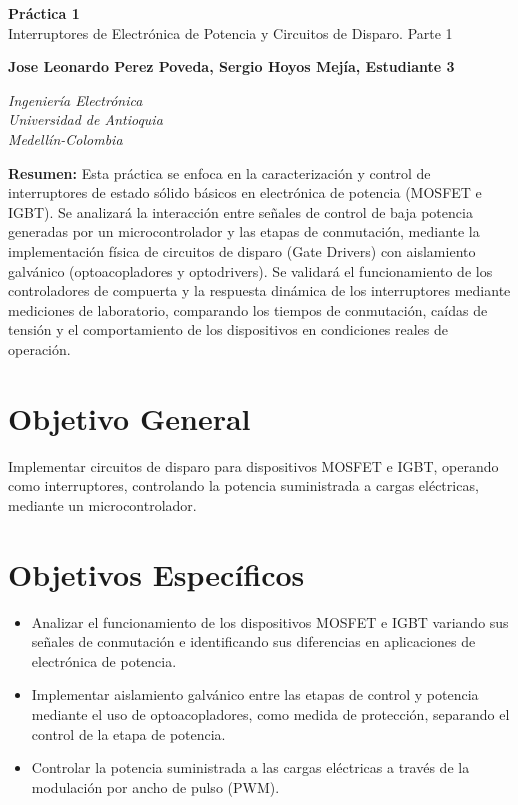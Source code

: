 \documentclass[12pt]{article}
\newcommand{\estudiantes}{Jose Leonardo Perez Poveda, Sergio Hoyos Mejía, Estudiante 3}
\begin{document}
\begin{center}
    {\Huge \textcolor{tituloazul}{\textbf{Práctica 1}\\ Interruptores de Electrónica de Potencia y Circuitos de Disparo. Parte 1}}
    \vspace{0.6cm}

    {\textbf{\estudiantes}}
    \vspace{0.5cm}

    \textit{Ingeniería Electrónica}\\
    \textit{Universidad de Antioquia}\\
    \textit{Medellín-Colombia}
\end{center}

\vspace{0.5cm}

\noindent\textcolor{tituloazul}{\textbf{Resumen:}} Esta práctica se enfoca en la caracterización y control de interruptores de estado sólido básicos en electrónica de potencia (MOSFET e IGBT). Se analizará la interacción entre señales de control de baja potencia generadas por un microcontrolador y las etapas de conmutación, mediante la implementación física de circuitos de disparo (Gate Drivers) con aislamiento galvánico (optoacopladores y optodrivers). Se validará el funcionamiento de los controladores de compuerta  y la respuesta dinámica de los interruptores mediante mediciones de laboratorio, comparando los tiempos de conmutación, caídas de tensión y el comportamiento de los dispositivos en condiciones reales de operación.


\section{Objetivo General}
Implementar circuitos de disparo para dispositivos MOSFET e IGBT, operando como interruptores, controlando la potencia suministrada a cargas eléctricas, mediante un microcontrolador.

\section{Objetivos Específicos}
    \begin{itemize}
        \item Analizar el funcionamiento de los dispositivos MOSFET e IGBT variando sus señales de conmutación e identificando sus diferencias en aplicaciones de electrónica de potencia.
        \item Implementar aislamiento galvánico entre las etapas de control y potencia mediante el uso de optoacopladores, como medida de protección, separando el control de la etapa de potencia.
        \item Controlar la potencia suministrada a las cargas eléctricas a través de la modulación por ancho de pulso (PWM).
    \end{itemize}
\end{document}
